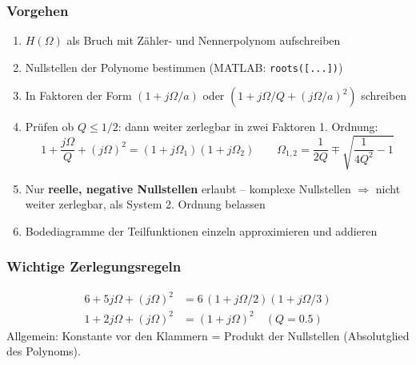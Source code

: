 \documentclass[a4paper,12pt]{article}
\begin{document}
	\subsubsection*{Vorgehen}
	\begin{enumerate}
		\item $H(\Omega)$ als Bruch mit Zähler- und Nennerpolynom aufschreiben
		\item Nullstellen der Polynome bestimmen (MATLAB: \texttt{roots([...])})
		\item In Faktoren der Form $(1+j\Omega/a)$ oder $(1+j\Omega/Q+(j\Omega/a)^2)$ schreiben
		\item Prüfen ob $Q \leq 1/2$: dann weiter zerlegbar in zwei Faktoren 1. Ordnung:
		\begin{equation}
			1 + \frac{j\Omega}{Q} + (j\Omega)^2 = (1+j\Omega_1)(1+j\Omega_2)
			\qquad \Omega_{1,2} = \frac{1}{2Q} \mp \sqrt{\frac{1}{4Q^2}-1}
		\end{equation}
		\item Nur \textbf{reelle, negative Nullstellen} erlaubt -- komplexe Nullstellen
		$\Rightarrow$ nicht weiter zerlegbar, als System 2. Ordnung belassen
		\item Bodediagramme der Teilfunktionen einzeln approximieren und addieren
	\end{enumerate}
	
	
	\subsubsection*{Wichtige Zerlegungsregeln}
	\begin{align}
		6 + 5j\Omega + (j\Omega)^2 &= 6\,(1+j\Omega/2)(1+j\Omega/3) \\
		1 + 2j\Omega + (j\Omega)^2 &= (1+j\Omega)^2 \quad (Q=0.5)
	\end{align}
	Allgemein: Konstante vor den Klammern = Produkt der Nullstellen (Absolutglied des Polynoms).
	
	
\end{document}
